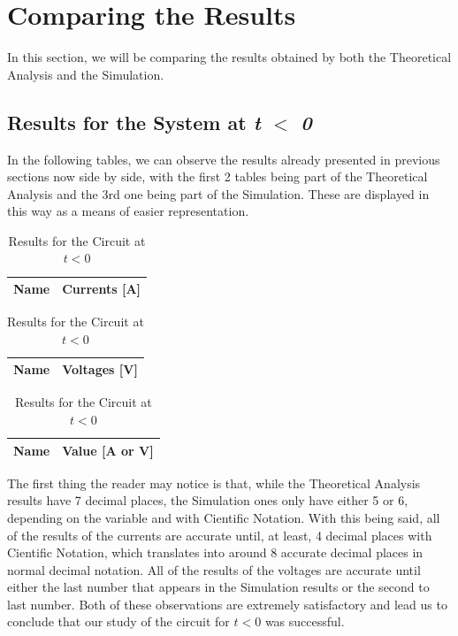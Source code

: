 \clearpage

\section{Comparing the Results}
\label{sec:comparing}

In this section, we will be comparing the results obtained by both the Theoretical Analysis and the Simulation.

\subsection{Results for the System at \textit{t $<$ 0}}

In the following tables, we can observe the results already presented in previous sections now side by side, with the first
2 tables being part of the Theoretical Analysis and the 3rd one being part of the Simulation. These are displayed in this
way as a means of easier representation.

\begin{table}[htb!]
  \begin{tabular}{|l|r|}
      \hline    
      {\bf Name} & {\bf Currents [A]} \\ \hline
      
  \end{tabular}
\quad
  \begin{tabular}{|l|r|}
    \hline    
    {\bf Name} & {\bf Voltages [V]} \\ \hline
    
  \end{tabular}
\quad
  \begin{tabular}{|l|r|}
    \hline    
    {\bf Name} & {\bf Value [A or V]} \\ \hline
    
  \end{tabular}
  \caption{Results for the Circuit at $t<0$}
\end{table}

The first thing the reader may notice is that, while the Theoretical Analysis results have 7 decimal places, the Simulation ones only have either 5 or 6, depending on the variable and with Cientific Notation. With this being said, all of the results of the currents are accurate until, at least, 4 decimal places with Cientific Notation, which translates into around 8 accurate decimal places in normal decimal notation. All of the results of the voltages are accurate until either the last number that appears in the Simulation results or the second to last number. Both of these observations are extremely satisfactory and lead us to conclude that our study of the circuit for $t < 0$ was successful.

